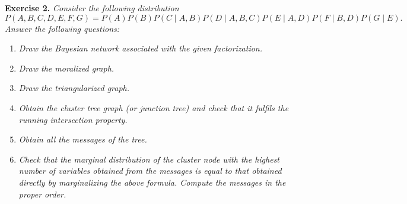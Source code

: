 \documentclass[11pt]{article}
\theoremstyle{definition}
\begin{document}
\textbf{Exercise 2. }\emph{Consider the following distribution}
\[
     P(A,B,C,D,E,F,G) = P(A)P(B)P(C \mid A, B)P(D \mid A, B, C)P(E \mid A, D)P(F \mid B, D)P(G \mid E).
\]
\emph{Answer the following questions:}
\begin{enumerate}
    \item \emph{Draw the Bayesian network associated with the given factorization.}
    \item \emph{Draw the moralized graph.}
    \item \emph{Draw the triangularized graph.}
    \item \emph{Obtain the cluster tree graph (or junction tree) and check that it fulfils the running intersection property.}
    \item \emph{Obtain all the messages of the tree.}
    \item \emph{Check that the marginal distribution of the cluster node with the highest number of variables obtained from the messages is equal to that obtained directly by marginalizing the above formula. Compute the messages in the proper order.}
\end{enumerate}
\end{document}
